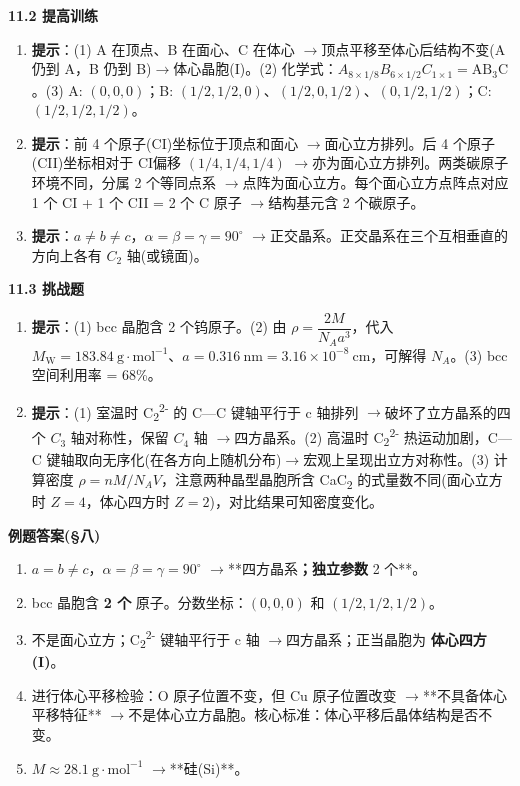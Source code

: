 \documentclass[a4paper,11pt]{ctexart}
\newcommand{\箭}{\ensuremath{\rightarrow}}
\newcommand{\左箭}{\ensuremath{\leftarrow}}
\newcommand{\上箭}{\ensuremath{\uparrow}}
\newcommand{\下箭}{\ensuremath{\downarrow}}
\newcommand{\衡}{\ensuremath{\rightleftharpoons}}
\newcommand{\双箭}{\ensuremath{\leftrightarrow}}
\newcommand{\约等于}{\ensuremath{\approx}}
\newcommand{\小于等于}{\ensuremath{\leq}}
\newcommand{\大于等于}{\ensuremath{\geq}}
\newcommand{\不等于}{\ensuremath{\neq}}
\newcommand{\西格马}{\ensuremath{\sigma}}
\newcommand{\派}{\ensuremath{\pi}}
\begin{document}
\textbf{11.2 提高训练}

\begin{enumerate}
\def\labelenumi{\arabic{enumi}.}
\setcounter{enumi}{3}
\item
  \textbf{提示}：(1) A 在顶点、B 在面心、C 在体心 \箭 顶点平移至体心后结构不变(A 仍到 A，B 仍到 B)\箭 体心晶胞(I)。(2) 化学式：\(A_{8\times 1/8} B_{6\times 1/2} C_{1\times 1} = \mathrm{AB_3C}\)。(3) A: \((0,0,0)\)；B: \((1/2,1/2,0)\)、\((1/2,0,1/2)\)、\((0,1/2,1/2)\)；C: \((1/2,1/2,1/2)\)。
\item
  \textbf{提示}：前 4 个原子(CI)坐标位于顶点和面心 \箭 面心立方排列。后 4 个原子(CII)坐标相对于 CI偏移 \((1/4, 1/4, 1/4)\) \箭 亦为面心立方排列。两类碳原子环境不同，分属 2 个等同点系 \箭 点阵为面心立方。每个面心立方点阵点对应 1 个 CI + 1 个 CII = 2 个 C 原子 \箭 结构基元含 2 个碳原子。
\item
  \textbf{提示}：\(a \neq b \neq c\)，\(\alpha = \beta = \gamma = 90^\circ\) \箭 正交晶系。正交晶系在三个互相垂直的方向上各有 \(C_2\) 轴(或镜面)。
\end{enumerate}

\textbf{11.3 挑战题}

\begin{enumerate}
\def\labelenumi{\arabic{enumi}.}
\setcounter{enumi}{6}
\item
  \textbf{提示}：(1) bcc 晶胞含 2 个钨原子。(2) 由 \(\rho = \dfrac{2M}{N_A a^3}\)，代入 \(M_{\mathrm{W}} = 183.84\ \mathrm{g\cdot mol^{-1}}\)、\(a = 0.316\ \mathrm{nm} = 3.16\times 10^{-8}\ \mathrm{cm}\)，可解得 \(N_A\)。(3) bcc 空间利用率 = 68\%。
\item
  \textbf{提示}：(1) 室温时 C\textsubscript{2}\textsuperscript{2-} 的 C---C 键轴平行于 c 轴排列 \箭 破坏了立方晶系的四个 \(C_3\) 轴对称性，保留 \(C_4\) 轴 \箭 四方晶系。(2) 高温时 C\textsubscript{2}\textsuperscript{2-} 热运动加剧，C---C 键轴取向无序化(在各方向上随机分布)\箭 宏观上呈现出立方对称性。(3) 计算密度 \(\rho = nM/N_A V\)，注意两种晶型晶胞所含 CaC\textsubscript{2} 的式量数不同(面心立方时 \(Z = 4\)，体心四方时 \(Z = 2\))，对比结果可知密度变化。
\end{enumerate}

\textbf{例题答案(§八)}

\begin{enumerate}
\def\labelenumi{\arabic{enumi}.}
\item
  \(a = b \neq c\)，\(\alpha = \beta = \gamma = 90^\circ\) \箭 **四方晶系\textbf{；独立参数 }2 个**。
\item
  bcc 晶胞含 \textbf{2 个} 原子。分数坐标：\((0, 0, 0)\) 和 \((1/2, 1/2, 1/2)\)。
\item
  不是面心立方；C\textsubscript{2}\textsuperscript{2-} 键轴平行于 c 轴 \箭 四方晶系；正当晶胞为 \textbf{体心四方(I)}。
\item
  进行体心平移检验：O 原子位置不变，但 Cu 原子位置改变 \箭 **不具备体心平移特征** \箭 不是体心立方晶胞。核心标准：体心平移后晶体结构是否不变。
\item
  \(M \approx 28.1\ \mathrm{g\cdot mol^{-1}}\) \箭 **硅(Si)**。
\end{enumerate}
\end{document}
